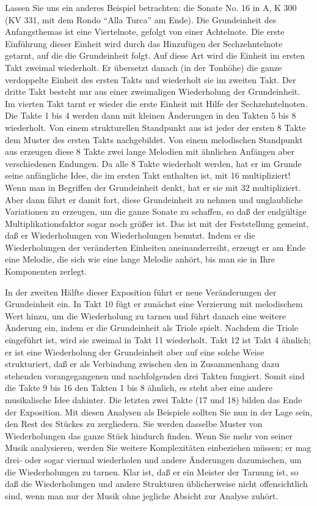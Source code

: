 Lassen Sie uns ein anderes Beispiel betrachten: die Sonate No. 16 in A, K 300 (KV 331, mit dem Rondo \enquote{Alla Turca} am Ende).
Die Grundeinheit des Anfangsthemas ist eine Viertelnote, gefolgt von einer Achtelnote.
Die erste Einführung dieser Einheit wird durch das Hinzufügen der Sechzehntelnote getarnt, auf die die Grundeinheit folgt.
Auf diese Art wird die Einheit im ersten Takt zweimal wiederholt.
Er übersetzt danach (in der Tonhöhe) die ganze verdoppelte Einheit des ersten Takts und wiederholt sie im zweiten Takt.
Der dritte Takt besteht nur aus einer zweimaligen Wiederholung der Grundeinheit.
Im vierten Takt tarnt er wieder die erste Einheit mit Hilfe der Sechzehntelnoten.
Die Takte 1 bis 4 werden dann mit kleinen Änderungen in den Takten 5 bis 8 wiederholt.
Von einem strukturellen Standpunkt aus ist jeder der ersten 8 Takte dem Muster des ersten Takts nachgebildet.
Von einem melodischen Standpunkt aus erzeugen diese 8 Takte zwei lange Melodien mit ähnlichen Anfängen aber verschiedenen Endungen.
Da alle 8 Takte wiederholt werden, hat er im Grunde seine anfängliche Idee, die im ersten Takt enthalten ist, mit 16 multipliziert!
Wenn man in Begriffen der Grundeinheit denkt, hat er sie mit 32 multipliziert.
Aber dann fährt er damit fort, diese Grundeinheit zu nehmen und unglaubliche Variationen zu erzeugen, um die ganze Sonate zu schaffen, so daß der endgültige Multiplikationsfaktor sogar noch größer ist.
Das ist mit der Feststellung gemeint, daß er Wiederholungen von Wiederholungen benutzt.
Indem er die Wiederholungen der veränderten Einheiten aneinanderreiht, erzeugt er am Ende eine Melodie, die sich wie eine lange Melodie anhört, bis man sie in Ihre Komponenten zerlegt.

In der zweiten Hälfte dieser Exposition führt er neue Veränderungen der Grundeinheit ein.
In Takt 10 fügt er zunächst eine Verzierung mit melodischem Wert hinzu, um die Wiederholung zu tarnen und führt danach eine weitere Änderung ein, indem er die Grundeinheit als Triole spielt.
Nachdem die Triole eingeführt ist, wird sie zweimal in Takt 11 wiederholt.
Takt 12 ist Takt 4 ähnlich; er ist eine Wiederholung der Grundeinheit aber auf eine solche Weise strukturiert, daß er als Verbindung zwischen den in Zusammenhang dazu stehenden vorangegangenen und nachfolgenden drei Takten fungiert.
Somit sind die Takte 9 bis 16 den Takten 1 bis 8 ähnlich, es steht aber eine andere musikalische Idee dahinter.
Die letzten zwei Takte (17 und 18) bilden das Ende der Exposition.
Mit diesen Analysen als Beispiele sollten Sie nun in der Lage sein, den Rest des Stückes zu zergliedern.
Sie werden dasselbe Muster von Wiederholungen das ganze Stück hindurch finden.
Wenn Sie mehr von seiner Musik analysieren, werden Sie weitere Komplexitäten einbeziehen müssen; er mag drei- oder sogar viermal wiederholen und andere Änderungen dazumischen, um die Wiederholungen zu tarnen.
Klar ist, daß er ein Meister der Tarnung ist, so daß die Wiederholungen und andere Strukturen üblicherweise nicht offensichtlich sind, wenn man nur der Musik ohne jegliche Absicht zur Analyse zuhört.

